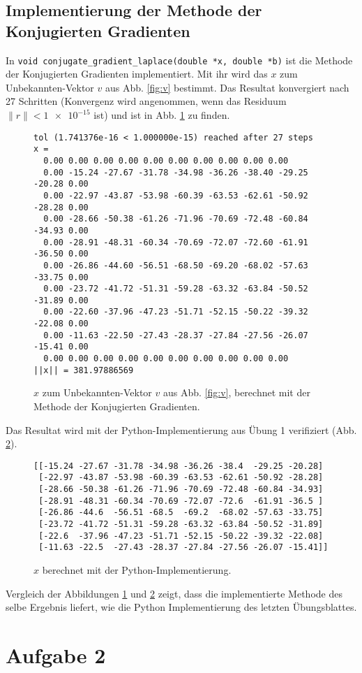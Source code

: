 \documentclass[10pt,a4paper]{article}
\begin{document}
\subsection{Implementierung der Methode der Konjugierten Gradienten}

In \texttt{void conjugate\_gradient\_laplace(double *x, double *b)} ist die
Methode der Konjugierten Gradienten implementiert. Mit ihr wird das $x$ zum
Unbekannten-Vektor $v$ aus Abb. \ref{fig:v} bestimmt. Das Resultat konvergiert
nach 27 Schritten (Konvergenz wird angenommen, wenn das Residuum $\|r\| <
\num{1e-15}$ ist) und ist in Abb. \ref{fig:converged_x} zu finden.

\begin{figure}[H]
  \centering
\begin{verbatim}
tol (1.741376e-16 < 1.000000e-15) reached after 27 steps
x = 
  0.00 0.00 0.00 0.00 0.00 0.00 0.00 0.00 0.00 0.00 
  0.00 -15.24 -27.67 -31.78 -34.98 -36.26 -38.40 -29.25 -20.28 0.00 
  0.00 -22.97 -43.87 -53.98 -60.39 -63.53 -62.61 -50.92 -28.28 0.00 
  0.00 -28.66 -50.38 -61.26 -71.96 -70.69 -72.48 -60.84 -34.93 0.00 
  0.00 -28.91 -48.31 -60.34 -70.69 -72.07 -72.60 -61.91 -36.50 0.00 
  0.00 -26.86 -44.60 -56.51 -68.50 -69.20 -68.02 -57.63 -33.75 0.00 
  0.00 -23.72 -41.72 -51.31 -59.28 -63.32 -63.84 -50.52 -31.89 0.00 
  0.00 -22.60 -37.96 -47.23 -51.71 -52.15 -50.22 -39.32 -22.08 0.00 
  0.00 -11.63 -22.50 -27.43 -28.37 -27.84 -27.56 -26.07 -15.41 0.00 
  0.00 0.00 0.00 0.00 0.00 0.00 0.00 0.00 0.00 0.00 
||x|| = 381.97886569
\end{verbatim}
  \caption{$x$ zum Unbekannten-Vektor $v$ aus Abb. \ref{fig:v}, berechnet mit
    der Methode der Konjugierten Gradienten.}
  \label{fig:converged_x}
\end{figure}

Das Resultat wird mit der Python-Implementierung aus Übung 1 verifiziert (Abb.
\ref{fig:python_x}).

\begin{figure}[H]
  \centering
\begin{verbatim}
[[-15.24 -27.67 -31.78 -34.98 -36.26 -38.4  -29.25 -20.28]
 [-22.97 -43.87 -53.98 -60.39 -63.53 -62.61 -50.92 -28.28]
 [-28.66 -50.38 -61.26 -71.96 -70.69 -72.48 -60.84 -34.93]
 [-28.91 -48.31 -60.34 -70.69 -72.07 -72.6  -61.91 -36.5 ]
 [-26.86 -44.6  -56.51 -68.5  -69.2  -68.02 -57.63 -33.75]
 [-23.72 -41.72 -51.31 -59.28 -63.32 -63.84 -50.52 -31.89]
 [-22.6  -37.96 -47.23 -51.71 -52.15 -50.22 -39.32 -22.08]
 [-11.63 -22.5  -27.43 -28.37 -27.84 -27.56 -26.07 -15.41]]
\end{verbatim}
  \caption{$x$ berechnet mit der Python-Implementierung.}
  \label{fig:python_x}
\end{figure}

Vergleich der Abbildungen \ref{fig:converged_x} und \ref{fig:python_x} zeigt,
dass die implementierte Methode des selbe Ergebnis liefert, wie die Python
Implementierung des letzten Übungsblattes.

\section{Aufgabe 2}
\end{document}
